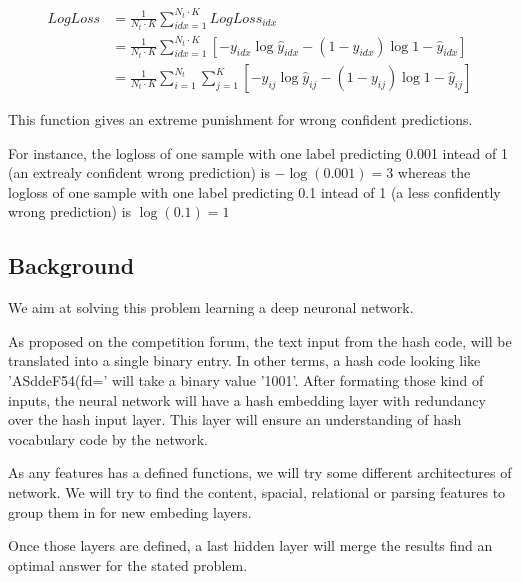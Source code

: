 		\begin{equation} \label{eq1}
			\begin{split}
				LogLoss & = \frac{1}{N_t \cdot K} \sum_{idx=1}^{N_t \cdot K} LogLoss_{idx} \\
				&= \frac{1}{N_t \cdot K} \sum_{idx=1}^{N_t \cdot K} [-y_{idx} \log{\hat{y}_{idx}} - (1-y_{idx}) \log{1-\hat{y}_{idx}}] \\
		        &= \frac{1}{N_t \cdot K} \sum_{i=1}^{N_t} \sum_{j=1}^{K} [-y_{ij} \log{\hat{y}_{ij}} - (1-y_{ij}) \log{1-\hat{y}_{ij}}]
			\end{split}
		\end{equation}

		This function gives an extreme punishment for wrong confident predictions. 

		For instance, the logloss of one sample with one label predicting 0.001 intead of 1 (an extrealy confident wrong prediction) is $-\log(0.001) = 3 $ whereas the logloss of one sample with one label predicting 0.1 intead of 1 (a less confidently wrong prediction) is $\log(0.1) = 1$





	\subsection{Background}
		We aim at solving this problem learning a deep neuronal network.


		As proposed on the competition forum, the text input from the hash code, will be translated into a single binary entry. In other terms, a hash code looking like 'ASddeF54(fd=' will take a binary value '1001'. After formating those kind of inputs, the neural network will have a hash embedding layer with redundancy over the hash input layer. This layer will ensure an understanding of hash vocabulary code by the network. 

		As any features has a defined functions, we will try some different architectures of network. We will try to find the content, spacial, relational or parsing features to group them in for new embeding layers.

		Once those layers are defined, a last hidden layer will merge the results find an optimal answer for the stated problem.


